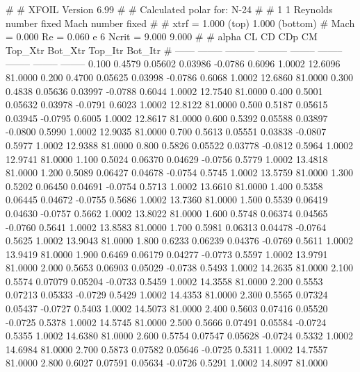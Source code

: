 #  
#       XFOIL         Version 6.99
#  
# Calculated polar for: N-24                                            
#  
# 1 1 Reynolds number fixed          Mach number fixed         
#  
# xtrf =   1.000 (top)        1.000 (bottom)  
# Mach =   0.000     Re =     0.060 e 6     Ncrit =   9.000  9.000
#  
#   alpha    CL        CD       CDp       CM     Top_Xtr  Bot_Xtr  Top_Itr  Bot_Itr
#  ------ -------- --------- --------- -------- -------- -------- -------- --------
   0.100   0.4579   0.05602   0.03986  -0.0786   0.6096   1.0002  12.6096  81.0000
   0.200   0.4700   0.05625   0.03998  -0.0786   0.6068   1.0002  12.6860  81.0000
   0.300   0.4838   0.05636   0.03997  -0.0788   0.6044   1.0002  12.7540  81.0000
   0.400   0.5001   0.05632   0.03978  -0.0791   0.6023   1.0002  12.8122  81.0000
   0.500   0.5187   0.05615   0.03945  -0.0795   0.6005   1.0002  12.8617  81.0000
   0.600   0.5392   0.05588   0.03897  -0.0800   0.5990   1.0002  12.9035  81.0000
   0.700   0.5613   0.05551   0.03838  -0.0807   0.5977   1.0002  12.9388  81.0000
   0.800   0.5826   0.05522   0.03778  -0.0812   0.5964   1.0002  12.9741  81.0000
   1.100   0.5024   0.06370   0.04629  -0.0756   0.5779   1.0002  13.4818  81.0000
   1.200   0.5089   0.06427   0.04678  -0.0754   0.5745   1.0002  13.5759  81.0000
   1.300   0.5202   0.06450   0.04691  -0.0754   0.5713   1.0002  13.6610  81.0000
   1.400   0.5358   0.06445   0.04672  -0.0755   0.5686   1.0002  13.7360  81.0000
   1.500   0.5539   0.06419   0.04630  -0.0757   0.5662   1.0002  13.8022  81.0000
   1.600   0.5748   0.06374   0.04565  -0.0760   0.5641   1.0002  13.8583  81.0000
   1.700   0.5981   0.06313   0.04478  -0.0764   0.5625   1.0002  13.9043  81.0000
   1.800   0.6233   0.06239   0.04376  -0.0769   0.5611   1.0002  13.9419  81.0000
   1.900   0.6469   0.06179   0.04277  -0.0773   0.5597   1.0002  13.9791  81.0000
   2.000   0.5653   0.06903   0.05029  -0.0738   0.5493   1.0002  14.2635  81.0000
   2.100   0.5574   0.07079   0.05204  -0.0733   0.5459   1.0002  14.3558  81.0000
   2.200   0.5553   0.07213   0.05333  -0.0729   0.5429   1.0002  14.4353  81.0000
   2.300   0.5565   0.07324   0.05437  -0.0727   0.5403   1.0002  14.5073  81.0000
   2.400   0.5603   0.07416   0.05520  -0.0725   0.5378   1.0002  14.5745  81.0000
   2.500   0.5666   0.07491   0.05584  -0.0724   0.5355   1.0002  14.6380  81.0000
   2.600   0.5754   0.07547   0.05628  -0.0724   0.5332   1.0002  14.6984  81.0000
   2.700   0.5873   0.07582   0.05646  -0.0725   0.5311   1.0002  14.7557  81.0000
   2.800   0.6027   0.07591   0.05634  -0.0726   0.5291   1.0002  14.8097  81.0000
